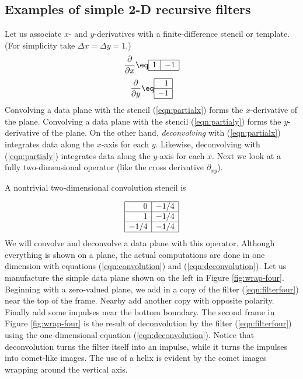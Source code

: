\subsection{Examples of simple 2-D recursive filters}
Let us associate $x$- and $y$-derivatives with
a finite-difference stencil or template.
(For simplicity take $\Delta x=\Delta y=1$.)
\begin{equation}
 \frac{\partial }{ \partial x } \eq
 \begin{array}{|c|c|} \hline
   1    & -1
   \\ \hline
 \end{array}
 \label{eqn:partialx}
\end{equation}
\begin{equation}
 \frac{\partial }{ \partial y } \eq
  \begin{array}{|r|} \hline
    1  \\
    \hline
    -1
    \\ \hline
  \end{array}
  \label{eqn:partialy}
\end{equation}
Convolving a data plane with
the stencil (\ref{eqn:partialx})
forms the $x$-derivative of the plane.
Convolving a data plane with
the stencil (\ref{eqn:partialy})
forms the $y$-derivative of the plane.
On the other hand,
{\it deconvolving}
with (\ref{eqn:partialx}) integrates data along the $x$-axis for each $y$.
Likewise, deconvolving
with (\ref{eqn:partialy}) integrates data along the $y$-axis for each $x$.
Next we look at a fully two-dimensional operator
(like the cross derivative $\partial_{xy}$).


\par
A nontrivial two-dimensional convolution stencil is
\par
\begin{equation}
        \begin{array}{|r|r|}   \hline
                0    & -1/4 \\
                \hline
                1    & -1/4 \\
                \hline
                -1/4 & -1/4
                \\ \hline
        \end{array}
\label{eqn:filterfour}
\end{equation}
We will convolve and deconvolve a data plane with this operator.
Although everything is shown on a plane,
the actual computations are done in one dimension
with equations
(\ref{eqn:convolution}) and
(\ref{eqn:deconvolution}).
Let us manufacture the simple data plane
shown on the left in Figure \ref{fig:wrap-four}.
Beginning with a zero-valued plane, we add
in a copy of the filter (\ref{eqn:filterfour})
near the top of the frame.
Nearby add another copy with opposite polarity.
Finally add some impulses near the bottom boundary.
The second frame in Figure \ref{fig:wrap-four} is the result
of deconvolution by the filter (\ref{eqn:filterfour})
using the one-dimensional equation (\ref{eqn:deconvolution}).
Notice that deconvolution
turns the filter itself into an impulse,
while it turns the impulses
into comet-like images.
The use of a helix is evident
by the comet images wrapping around the vertical axis.

